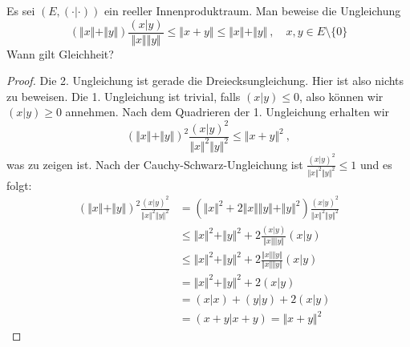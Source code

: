 \setcounter{aufgabe}{5}
\begin{aufgabe}
	Es sei $(E, (\cdot | \cdot))$ ein reeller Innenproduktraum. Man beweise die Ungleichung
	\[
		(\Vert x \Vert + \Vert y \Vert) \frac{(x|y)}{\Vert x \Vert \Vert y \Vert}
			\leq \Vert x + y \Vert
			\leq \Vert x \Vert + \Vert y \Vert \ , \quad x,y \in E\setminus\{0\}
	\]
	Wann gilt Gleichheit?
\end{aufgabe}
\begin{proof}
	Die 2. Ungleichung ist gerade die Dreiecksungleichung. Hier ist also nichts zu beweisen.
	Die 1. Ungleichung ist trivial, falls $(x | y) \leq 0$, also können wir $(x | y) \geq 0$
	annehmen.
	Nach dem Quadrieren der 1. Ungleichung erhalten wir
	\[
		\left( \Vert x \Vert + \Vert y \Vert \right)^2 \frac{ (x|y)^2 }{\Vert x \Vert^2 \Vert y \Vert^2}
			\leq \Vert x + y \Vert^2 \ ,
	\]
	was zu zeigen ist. Nach der Cauchy-Schwarz-Ungleichung ist
	$\frac{ (x | y)^2}{ \Vert x \Vert^2 \Vert y \Vert^2} \leq 1$ und es
	folgt:
	\begin{align*}
		\left( \Vert x \Vert + \Vert y \Vert \right)^2 \frac{ (x|y)^2 }{\Vert x \Vert^2 \Vert y \Vert^2}
		 &= \left( \Vert x \Vert^2 + 2 \Vert x \Vert \Vert y \Vert + \Vert y \Vert^2 \right)
		 \frac{ (x | y)^2 }{ \Vert x \Vert^2 \Vert y \Vert^2} \\
		 &\leq \Vert x \Vert^2 + \Vert y \Vert^2 + 2 \frac{ (x | y) }{ \Vert x \Vert \Vert y \Vert}
		 (x | y) \\
		 &\leq \Vert x \Vert^2 + \Vert y \Vert^2 + 2 \frac{ \Vert x \Vert \Vert y \Vert}{ 
			 	\Vert x \Vert \Vert y \Vert } (x | y) \\
			&= \Vert x \Vert^2 + \Vert y \Vert^2 + 2 (x | y) \\
			&= (x | x) + (y | y) + 2(x | y) \\
			&= (x + y | x + y) = \Vert x + y \Vert^2
	\end{align*}
\end{proof}

